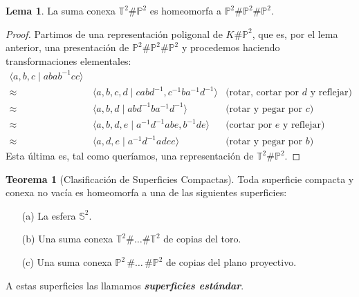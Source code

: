 \documentclass[10pt]{report}
\newcommand{\Esfera}{\mathbb{S}^2}
\newcommand{\Toro}{\mathbb{T}^2}
\newcommand{\Proyectivo}{\mathbb{P}^2}
\newcommand{\enfatiza}[1]{\textbf{\textit{#1}}}
\theoremstyle{definition}
\newtheorem{tma}[defin]{Teorema}
\newtheorem{lema}[defin]{Lema}
\begin{document}
\begin{lema}\label{lema:toro_proyectivo}
La suma conexa $\Toro \# \Proyectivo$ es homeomorfa a $\Proyectivo \# \Proyectivo \# \Proyectivo$.
\end{lema}
\begin{proof}
Partimos de una representación poligonal de $K\# \Proyectivo$, que es, por el lema anterior, una presentación de $\Proyectivo \# \Proyectivo \# \Proyectivo$ y procedemos haciendo transformaciones elementales:
\begin{align*}
\langle a,b,c \mid abab^{-1}cc \rangle &&\\
\approx &\, \langle a,b,c,d \mid cabd^{-1}, c^{-1}ba^{-1}d^{-1} \rangle &\text{(rotar, cortar por } d\text{ y reflejar)}\\
\approx &\, \langle a,b,d \mid abd^{-1}ba^{-1}d^{-1}\rangle & \text{(rotar y pegar por } c\text{)}\\
\approx &\, \langle a,b,d,e \mid a^{-1}d^{-1}abe, b^{-1}de\rangle & \text{(cortar por }e\text{ y reflejar)}\\
\approx &\, \langle a,d,e\mid a^{-1}d^{-1}adee\rangle & \text{(rotar y pegar por } b \text{)} 
\end{align*}
Esta última es, tal como queríamos, una representación de $\Toro \# \Proyectivo$.
\end{proof}

\begin{tma}[Clasificación de Superficies Compactas]\label{teo:csc}
Toda superficie compacta y conexa no vacía es homeomorfa a una de las siguientes superficies:
\begin{itemize}
\item[(a)] La esfera $\Esfera$.
\item[(b)] Una suma conexa $\Toro \# \dots \# \Toro$ de copias del toro.
\item[(c)] Una suma conexa $\Proyectivo \,  \# \dots\, \# \Proyectivo$ de copias del plano proyectivo. 
\end{itemize}
A estas superficies las llamamos \enfatiza{superficies estándar}.
\end{tma}
\end{document}
